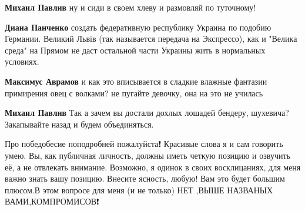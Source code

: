 \begin{itemize}
\begin{itemize}
 
\textbf{Михаил Павлив} ну и сиди в своем хлеву и размовляй по туточному!🤣

 
\textbf{Диана Панченко} создать федеративную республику Украина по подобию
Германии. Великий Львів (так называется передача на Экспрессо), как и "Велика
среда" на Прямом не даст остальной части Украины жить в нормальных условиях.

 
\textbf{Максимус Аврамов} и как это вписывается в сладкие влажные фантазии примирения овец с волками? не пугайте девочку, она на это не училась

 
\textbf{Михаил Павлив} Так а зачем вы достали дохлых лошадей бендеру, шухевича? Закапывайте назад и будем объединяться.

\end{itemize}

 

Про победобесие поподробней пожалуйста❗ Красивые слова я и сам говорить умею.
Вы, как публичная личность, должны иметь четкую позицию и озвучить её, а не
отвлекать внимание. Возможно, я одинок в своих восклицаниях, для меня важно
знать вашу позицию. Внесите ясность, любую! Вам это будет большим плюсом.В этом
вопросе для меня (и не только) НЕТ ,ВЫШЕ НАЗВАНЫХ ВАМИ,КОМПРОМИСОВ❗


\end{itemize}
